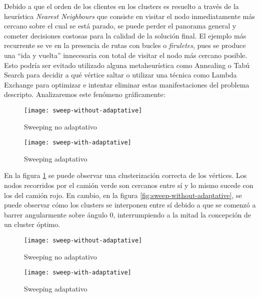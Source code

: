 Debido a que el orden de los clientes en los clusters es resuelto a través de la heurística \textit{Nearest Neighbours} que consiste en visitar el nodo inmediatamente más cercano sobre el cual se está parado, se puede perder el panorama general y cometer decisiones costosas para la calidad de la solución final. El ejemplo más recurrente se ve en la presencia de rutas con bucles o \textit{firuletes}, pues se produce una ``ida y vuelta'' innecesaria con total de visitar el nodo más cercano posible. Esto podría ser evitado utilizado alguna metaheurística como Annealing o Tabú Search para decidir a qué vértice saltar o utilizar una técnica como Lambda Exchange para optimizar e intentar eliminar estas manifestaciones del problema descripto. Analizaremos este fenómeno gráficamente:

\begin{figure}[H]
	\centering
	\begin{minipage}{0.48\textwidth}
		\centering
		\texttt{[image: sweep-without-adaptative]}
		\caption{\footnotesize Sweeping no adaptativo}
		\label{fig:sweep-without-adaptative}
	\end{minipage}%
	\hspace{0.03\textwidth}
	\begin{minipage}{0.48\textwidth}
		\centering
		\texttt{[image: sweep-with-adaptative]}
		\caption{\footnotesize Sweeping adaptativo}
		\label{fig:sweep-with-adaptative}
	\end{minipage}%
\end{figure}

En la figura \ref{fig:sweep-with-adaptative} se puede observar una clusterización correcta de los vértices. Los nodos recorridos por el camión verde son cercanos entre sí y lo mismo sucede con los del camión rojo. En cambio, en la figura \ref{fig:sweep-without-adaptative}, se puede observar cómo los clusters se interponen entre sí debido a que se comenzó a barrer angularmente sobre ángulo $0$, interrumpiendo a la mitad la concepción de un cluster óptimo.

\begin{figure}[H]
	\centering
	\begin{minipage}{0.48\textwidth}
		\centering
		\texttt{[image: sweep-without-adaptative]}
		\caption{\footnotesize Sweeping no adaptativo}
		\label{fig:big-sweep-without-adaptative-but-good}
	\end{minipage}%
	\hspace{0.03\textwidth}
	\begin{minipage}{0.48\textwidth}
		\centering
		\texttt{[image: sweep-with-adaptative]}
		\caption{\footnotesize Sweeping adaptativo}
		\label{fig:big-sweep-with-adaptative}
	\end{minipage}%
\end{figure}
